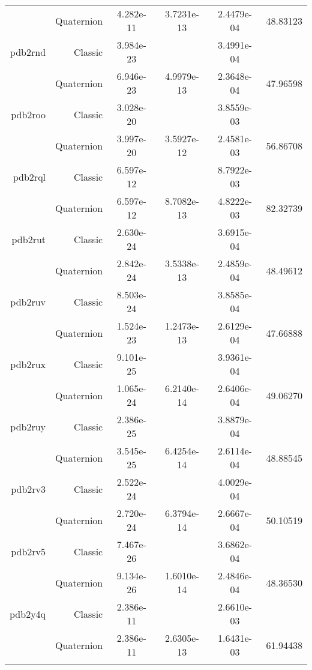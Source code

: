 \begin{xltabular}{\textwidth}{r|rS[table-format=1.3e+2]S[table-format=1.4e+2]S[table-format=1.4e+2]S[table-format=-1.5]}
& Quaternion & 4.282e-11 & 3.7231e-13 & 2.4479e-04 & 48.83123\\  \addlinespace
pdb2rnd & Classic & 3.984e-23 &  & 3.4991e-04 & \\
& Quaternion & 6.946e-23 & 4.9979e-13 & 2.3648e-04 & 47.96598\\  \addlinespace
pdb2roo & Classic & 3.028e-20 &  & 3.8559e-03 & \\
& Quaternion & 3.997e-20 & 3.5927e-12 & 2.4581e-03 & 56.86708\\  \addlinespace
pdb2rql & Classic & 6.597e-12 &  & 8.7922e-03 & \\
& Quaternion & 6.597e-12 & 8.7082e-13 & 4.8222e-03 & 82.32739\\  \addlinespace
pdb2rut & Classic & 2.630e-24 &  & 3.6915e-04 & \\
& Quaternion & 2.842e-24 & 3.5338e-13 & 2.4859e-04 & 48.49612\\  \addlinespace
pdb2ruv & Classic & 8.503e-24 &  & 3.8585e-04 & \\
& Quaternion & 1.524e-23 & 1.2473e-13 & 2.6129e-04 & 47.66888\\  \addlinespace
pdb2rux & Classic & 9.101e-25 &  & 3.9361e-04 & \\
& Quaternion & 1.065e-24 & 6.2140e-14 & 2.6406e-04 & 49.06270\\  \addlinespace
pdb2ruy & Classic & 2.386e-25 &  & 3.8879e-04 & \\
& Quaternion & 3.545e-25 & 6.4254e-14 & 2.6114e-04 & 48.88545\\  \addlinespace
pdb2rv3 & Classic & 2.522e-24 &  & 4.0029e-04 & \\
& Quaternion & 2.720e-24 & 6.3794e-14 & 2.6667e-04 & 50.10519\\  \addlinespace
pdb2rv5 & Classic & 7.467e-26 &  & 3.6862e-04 & \\
& Quaternion & 9.134e-26 & 1.6010e-14 & 2.4846e-04 & 48.36530\\  \addlinespace
pdb2y4q & Classic & 2.386e-11 &  & 2.6610e-03 & \\
& Quaternion & 2.386e-11 & 2.6305e-13 & 1.6431e-03 & 61.94438\\  \addlinespace
\end{xltabular}
